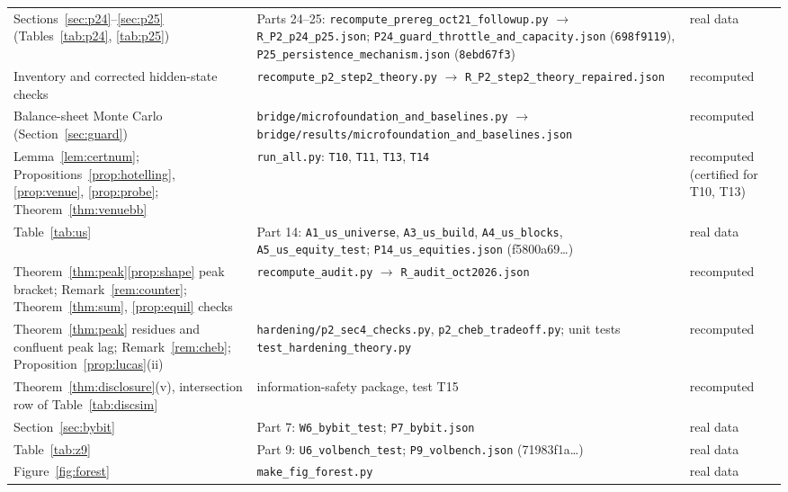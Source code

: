 \documentclass[12pt]{article}
\theoremstyle{definition}
\theoremstyle{remark}
\begin{document}
\begin{longtable}{p{}p{}p{}}
Sections~\ref{sec:p24}--\ref{sec:p25} (Tables~\ref{tab:p24}, \ref{tab:p25}) & Parts 24--25: \texttt{recompute\_\allowbreak prereg\_\allowbreak oct21\_\allowbreak followup.py} $\to$ \texttt{R\_P2\_\allowbreak p24\_\allowbreak p25.json}; \texttt{P24\_\allowbreak guard\_\allowbreak throttle\_\allowbreak and\_\allowbreak capacity.json} (\texttt{698f9119}), \texttt{P25\_\allowbreak persistence\_\allowbreak mechanism.json} (\texttt{8ebd67f3}) & real data\\
Inventory and corrected hidden-state checks & \texttt{recompute\_\allowbreak p2\_\allowbreak step2\_\allowbreak theory.py} $\to$ \texttt{R\_P2\_\allowbreak step2\_\allowbreak theory\_repaired.json} & recomputed\\
Balance-sheet Monte Carlo (Section~\ref{sec:guard}) & \texttt{bridge/\allowbreak microfoundation\_\allowbreak and\_\allowbreak baselines.py} $\to$ \texttt{bridge/\allowbreak results/\allowbreak microfoundation\_\allowbreak and\_\allowbreak baselines.json} & recomputed\\
Lemma~\ref{lem:certnum}; Propositions~\ref{prop:hotelling}, \ref{prop:venue}, \ref{prop:probe}; Theorem~\ref{thm:venuebb} & \texttt{run\_all.py}: \texttt{T10}, \texttt{T11}, \texttt{T13}, \texttt{T14} & recomputed (certified for T10, T13)\\
Table~\ref{tab:us} & Part 14: \texttt{A1\_us\_universe}, \texttt{A3\_us\_build}, \texttt{A4\_us\_blocks}, \texttt{A5\_us\_equity\_test}; \texttt{P14\_us\_equities.json} (f5800a69\ldots) & real data\\
Theorem~\ref{thm:peak}\ref{prop:shape} peak bracket; Remark~\ref{rem:counter}; Theorem~\ref{thm:sum}, \ref{prop:equil} checks & \texttt{recompute\_audit.py} $\to$ \texttt{R\_audit\_oct2026.json} & recomputed\\
Theorem~\ref{thm:peak} residues and confluent peak lag; Remark~\ref{rem:cheb}; Proposition~\ref{prop:lucas}(ii) & \texttt{hardening/p2\_sec4\_checks.py}, \texttt{p2\_cheb\_tradeoff.py}; unit tests \texttt{test\_hardening\_theory.py} & recomputed\\
Theorem~\ref{thm:disclosure}(v), intersection row of Table~\ref{tab:discsim} & information-safety package, test T15 & recomputed\\
Section~\ref{sec:bybit} & Part 7: \texttt{W6\_bybit\_test}; \texttt{P7\_bybit.json} & real data\\
Table~\ref{tab:z9} & Part 9: \texttt{U6\_volbench\_test}; \texttt{P9\_volbench.json} (71983f1a\ldots) & real data\\
Figure~\ref{fig:forest} & \texttt{make\_fig\_forest.py} & real data\\
\bottomrule
\end{longtable}
\end{document}
